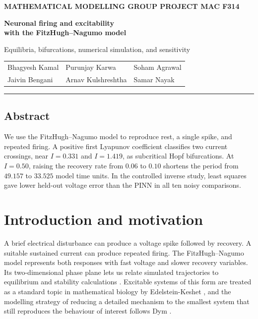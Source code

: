 \documentclass[11pt,a4paper]{article}
\newcommand{\memberA}{Bhagyesh Kamal}
\newcommand{\memberB}{Jaivin Bengani}
\newcommand{\memberC}{Purunjay Karwa}
\newcommand{\memberD}{Arnav Kulshreshtha}
\newcommand{\memberE}{Soham Agrawal}
\newcommand{\memberF}{Samar Nayak}
\begin{document}
{\color{reportaccent}\small\bfseries MATHEMATICAL MODELLING GROUP PROJECT \enspace MAC F314\par}
\vspace{0.45em}
{\color{reportink}\LARGE\bfseries Neuronal firing and excitability\\[0.15em]
with the FitzHugh--Nagumo model\par}
\vspace{0.35em}
{\large Equilibria, bifurcations, numerical simulation, and sensitivity\par}
\vspace{0.5em}
{\small
\begin{tabular}{@{}lll@{}}
\memberA & \memberC & \memberE\\
\memberB & \memberD & \memberF\\
\end{tabular}\par}

\vspace{0.7em}
\noindent\textcolor{reportaccent}{\rule{\linewidth}{1pt}}

\subsection*{Abstract}

We use the FitzHugh--Nagumo model to reproduce rest, a single spike, and repeated firing. A positive first Lyapunov coefficient classifies two current crossings, near \(I=0.331\) and \(I=1.419\), as subcritical Hopf bifurcations. At \(I=0.50\), raising the recovery rate from \(0.06\) to \(0.10\) shortens the period from \(49.157\) to \(33.525\) model time units. In the controlled inverse study, least squares gave lower held-out voltage error than the PINN in all ten noisy comparisons.

\section{Introduction and motivation}

A brief electrical disturbance can produce a voltage spike followed by recovery. A suitable sustained current can produce repeated firing. The FitzHugh--Nagumo model represents both responses with fast voltage and slower recovery variables. Its two-dimensional phase plane lets us relate simulated trajectories to equilibrium and stability calculations \cite{fitzhugh1961,nagumo1962}. Excitable systems of this form are treated as a standard topic in mathematical biology by Edelstein-Keshet \cite{edelsteinkeshet2005}, and the modelling strategy of reducing a detailed mechanism to the smallest system that still reproduces the behaviour of interest follows Dym \cite{dym2004}.
\end{document}
